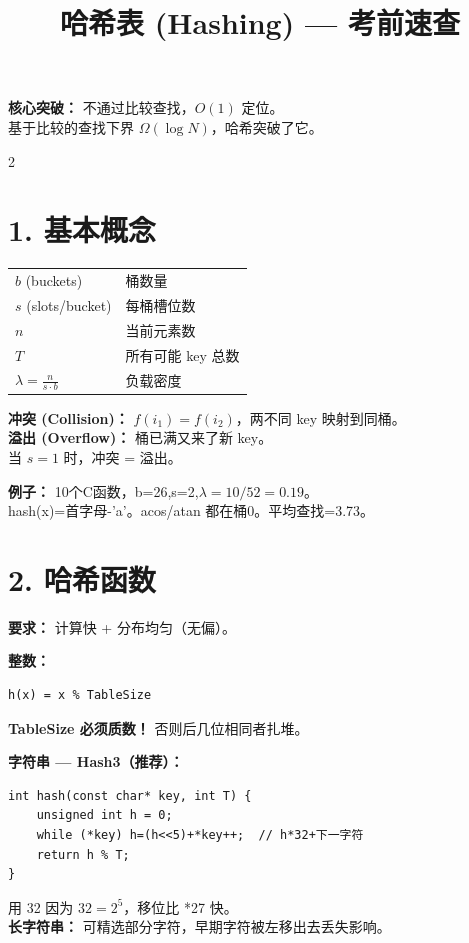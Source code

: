 \documentclass[10pt,a4paper]{article}
\title{\textbf{哈希表 (Hashing) — 考前速查}}
\author{}\date{}
\begin{document}
\maketitle\vspace{-8pt}

\begin{keybox}
\textbf{核心突破：} 不通过比较查找，$O(1)$ 定位。\\
基于比较的查找下界 $\Omega(\log N)$，哈希突破了它。
\end{keybox}

\begin{multicols}{2}

\section*{1. 基本概念}

\begin{tabular}{|l|l|}
\hline
$b$ (buckets) & 桶数量 \\
$s$ (slots/bucket) & 每桶槽位数 \\
$n$ & 当前元素数 \\
$T$ & 所有可能 key 总数 \\
$\lambda=\frac{n}{s\cdot b}$ & 负载密度 \\
\hline
\end{tabular}

\vspace{4pt}
\textbf{冲突 (Collision)：} $f(i_1)=f(i_2)$，两不同 key 映射到同桶。\\
\textbf{溢出 (Overflow)：} 桶已满又来了新 key。\\
当 $s=1$ 时，冲突 = 溢出。

\textbf{例子：} 10个C函数，b=26,s=2,$\lambda=10/52=0.19$。\\
hash(x)=首字母-'a'。acos/atan 都在桶0。平均查找=3.73。

\section*{2. 哈希函数}

\textbf{要求：} 计算快 + 分布均匀（无偏）。

\textbf{整数：}
\begin{lstlisting}
h(x) = x % TableSize
\end{lstlisting}
\textbf{TableSize 必须质数！} 否则后几位相同者扎堆。

\textbf{字符串 — Hash3（推荐）：}
\begin{lstlisting}
int hash(const char* key, int T) {
    unsigned int h = 0;
    while (*key) h=(h<<5)+*key++;  // h*32+下一字符
    return h % T;
}
\end{lstlisting}
用 32 因为 $32=2^5$，移位比 *27 快。\\
\textbf{长字符串：} 可精选部分字符，早期字符被左移出去丢失影响。


\end{multicols}
\end{document}

